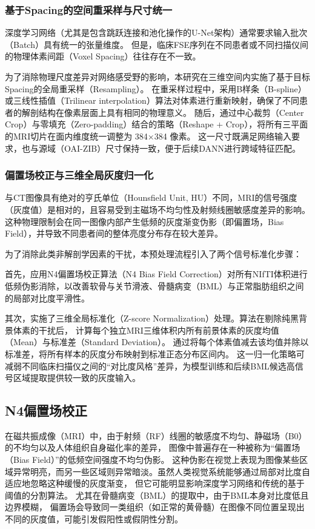     \subsubsection{基于Spacing的空间重采样与尺寸统一}
      深度学习网络（尤其是包含跳跃连接和池化操作的U-Net架构）通常要求输入批次（Batch）具有统一的张量维度。
      但是，临床FSE序列在不同患者或不同扫描仪间的物理体素间距（Voxel Spacing）往往存在不一致。
      \par 为了消除物理尺度差异对网络感受野的影响，本研究在三维空间内实施了基于目标Spacing的全局重采样（Resampling）。
      在重采样过程中，采用B样条（B-spline）或三线性插值（Trilinear interpolation）算法对体素进行重新映射，确保了不同患者的解剖结构在像素层面上具有相同的物理意义。
      随后，通过中心裁剪（Center Crop）与零填充（Zero-padding）结合的策略（Reshape + Crop），将所有三平面的MRI切片在面内维度统一调整为 384×384 像素。
      这一尺寸既满足网络输入要求，也与源域（OAI-ZIB）尺寸保持一致，便于后续DANN进行跨域特征匹配。
    \subsubsection{偏置场校正与三维全局灰度归一化}
      与CT图像具有绝对的亨氏单位（Hounsfield Unit, HU）不同，MRI的信号强度（灰度值）是相对的，且容易受到主磁场不均匀性及射频线圈敏感度差异的影响。
      这种物理限制会在同一图像内部产生低频的灰度渐变伪影（即偏置场，Bias Field），并导致不同患者间的整体亮度分布存在较大差异。
      \par 为了消除此类非解剖学因素的干扰，本预处理流程引入了两个信号标准化步骤：
      \par 首先，应用N4偏置场校正算法（N4 Bias Field Correction）对所有NIfTI体积进行低频伪影消除，以改善软骨与关节滑液、骨髓病变（BML）与正常脂肪组织之间的局部对比度平滑性。
      \par 其次，实施了三维全局标准化（Z-score Normalization）处理。算法在剔除纯黑背景体素的干扰后，
      计算每个独立MRI三维体积内所有前景体素的灰度均值（Mean）与标准差（Standard Deviation）。
      通过将每个体素值减去该均值并除以标准差，将所有样本的灰度分布映射到标准正态分布区间内。
      这一归一化策略可减弱不同临床扫描仪之间的“对比度风格”差异，为模型训练和后续BML候选高信号区域提取提供较一致的灰度输入。
  \subsection{N4偏置场校正}
    在磁共振成像（MRI）中，由于射频（RF）线圈的敏感度不均匀、静磁场（B0）的不均匀以及人体组织自身磁化率的差异，
    图像中普遍存在一种被称为“偏置场（Bias Field）”的低频空间强度不均匀伪影。
    这种伪影在视觉上表现为图像某些区域异常明亮，而另一些区域则异常暗淡。虽然人类视觉系统能够通过局部对比度自适应地忽略这种缓慢的灰度渐变，
    但它可能明显影响深度学习网络和传统的基于阈值的分割算法。
    尤其在骨髓病变（BML）的提取中，由于BML本身对比度低且边界模糊，
    偏置场会导致同一类组织（如正常的黄骨髓）在图像不同位置呈现出不同的灰度值，可能引发假阳性或假阴性分割。

